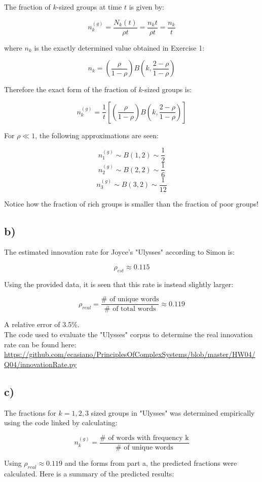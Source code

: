 \documentclass{article}
\begin{document}
The fraction of $k$-sized groups at time $t$ is given by:

\[ n_k ^{(g)} = \frac{N_k(t)}{\rho t} = \frac{n_k t}{\rho t} = \frac{n_k}{t}\]

where $n_k$ is the exactly determined value obtained in Exercise 1:

\[ n_k = (\frac{\rho}{1-\rho}) B(k, \frac{2-\rho}{1-\rho})\]

Therefore the exact form of the fraction of $k$-sized groups is:

\[  n_k ^{(g)} = \frac{1}{t} [(\frac{\rho}{1-\rho}) B(k, \frac{2-\rho}{1-\rho}) ]\]

For $\rho \ll 1$, the following approximations are seen:

\[ n_1^{(g)} \sim B(1,2) \sim \frac{1}{2} \]
\[ n_2^{(g)} \sim B(2,2) \sim \frac{1}{6} \]
\[ n_3^{(g)} \sim B(3,2) \sim \frac{1}{12} \]

Notice how the fraction of rich groups is smaller than the fraction of poor groups!

\subsection{b)}

The estimated innovation rate for Joyce's "Ulysses" according to Simon is:

\[ \rho_{est} \approx 0.115 \]

Using the provided data, it is seen that this rate is instead slightly larger:

\[ \rho_{real} = \frac{\# \text{ of unique words}}{\# \text{ of total words}} \approx 0.119 \]

A relative error of 3.5\%. \\

The code used to evaluate the "Ulysses" corpus to determine the real innovation rate can be found here: \url{https://github.com/ecasiano/PrinciplesOfComplexSystems/blob/master/HW04/Q04/innovationRate.py}

\subsection{c)}

The fractions for $k=1,2,3$ sized groups in "Ulysses" was determined empirically using the code linked by calculating:

\[ n_k^{(g)} = \frac{\# \text{ of words with frequency k}}{\# \text{ of unique words}} \]

Using $\rho_{real} \approx 0.119$ and the forms from part a, the predicted fractions were calculated. Here is a summary of the predicted results: \\
\end{document}
